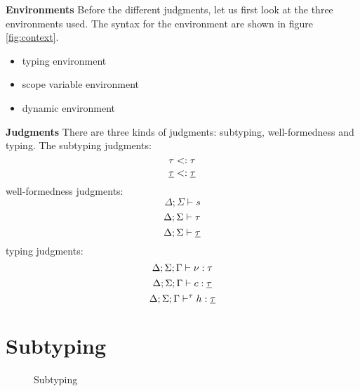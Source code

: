 {\textbf{Environments}
Before the different judgments, let us first look at the three environments used.
The syntax for the environment are shown in figure \ref{fig:context}.
\begin{itemize}
\item \Gamma typing environment
\item \Delta scope variable environment
\item \Sigma dynamic environment
\end{itemize}

\textbf{Judgments}
There are three kinds of judgments: subtyping, well-formedness and typing.
The subtyping judgments:
\[\tau <: \tau\]
\[\underline{\tau} <: \underline{\tau}\]
well-formedness judgments:
\[\Delta;\Sigma \vdash s\]
\[\Delta;\Sigma \vdash \tau\]
\[\Delta;\Sigma \vdash \underline{\tau}\]
typing judgments:
\[\Delta;\Sigma;\Gamma \vdash \nu : \tau\]
\[\Delta;\Sigma;\Gamma \vdash c : \underline{\tau}\]
\[\Delta;\Sigma;\Gamma \vdash^{\tau} h : \underline{\tau}\]

\section{Subtyping}
\begin{figure}
\caption{Subtyping}
\centering
{}
\end{figure}

}

